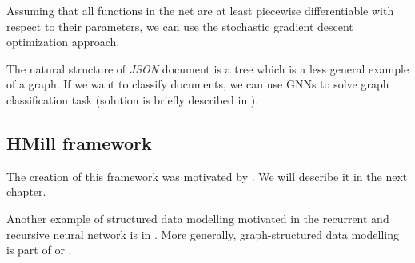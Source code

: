 Assuming that all functions in the net are at least piecewise differentiable with respect to their parameters, we can use the stochastic gradient descent optimization approach.

The natural structure of \emph{JSON} document is a tree which is a less general example of a graph. If we want to classify documents, we can use GNNs to solve graph classification task (solution is briefly described in \cite{Pevny2020}).

\subsection{HMill framework}
The creation of this framework was motivated by \cite{Pevny2016a}. We will describe it in the next chapter.

Another example of structured data modelling motivated in the recurrent and recursive neural network is in \cite{Woof2020}. More generally, graph-structured data modelling is part of \cite{Henaff2015} or \cite{Borgwardt2005}.







